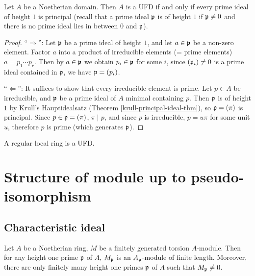 \begin{thm}
\label{UFD-iff-ht-1-principal}
Let $A$ be a Noetherian domain. Then $A$ is a UFD if and only if every prime ideal of height $1$ is principal
(recall that a prime ideal ${\mathfrak{p}}$ is of height $1$ if ${\mathfrak{p}} \neq 0$ and there is no prime ideal lies in between $0$ and ${\mathfrak{p}}$).
\end{thm}

\begin{proof}
``$\Rightarrow$'':
Let ${\mathfrak{p}}$ be a prime ideal of height $1$,
and let $a\in{\mathfrak{p}}$ be a non-zero element.
Factor $a$ into a product of irreducible elements
(= prime elements) $a=p_1\cdots p_r$.
Then by $a\in{\mathfrak{p}}$ we obtain $p_i\in{\mathfrak{p}}$ for some $i$,
since $({\mathfrak{p}}_i)\neq 0$ is a prime ideal contained in ${\mathfrak{p}}$, we have ${\mathfrak{p}}=(p_i)$.

``$\Leftarrow$'':
It suffices to show that every irreducible element is prime.
Let $p\in A$ be irreducible, and ${\mathfrak{p}}$ be a prime ideal of $A$ minimal containing $p$.
Then ${\mathfrak{p}}$ is of height $1$ by Krull's Hauptidealsatz
(Theorem \ref{krull-principal-ideal-thm}),
so ${\mathfrak{p}}=(\pi)$ is principal.
Since $p\in{\mathfrak{p}}=(\pi)$, $\pi\mid p$, and since $p$ is irreducible,
$p=u\pi$ for some unit $u$, therefore $p$ is prime (which generates ${\mathfrak{p}}$).
\end{proof}

\begin{thm}
\label{regular-local-ring-is-UFD}
A regular local ring is a UFD.
\end{thm}

\section{Structure of module up to pseudo-isomorphism}

\subsection{Characteristic ideal}

\begin{prop}
\label{char-ideal-preliminary}
Let $A$ be a Noetherian ring, $M$ be a
finitely generated torsion $A$-module.
Then for any height one prime ${\mathfrak{p}}$ of $A$,
$M_{\mathfrak{p}}$ is an $A_{\mathfrak{p}}$-module of finite length. Moreover, there are only finitely
many height one primes ${\mathfrak{p}}$ of $A$ such that $M_{\mathfrak{p}}\neq 0$.
\end{prop}

